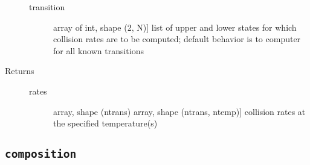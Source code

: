 \documentclass[letterpaper,10pt,english]{sphinxmanual}
\begin{document}
\begin{fulllineitems}
\begin{fulllineitems}
\begin{description}
\begin{description}
\item[{transition}] \leavevmode{[}array of int, shape (2, N){]}
list of upper and lower states for which collision rates
are to be computed; default behavior is to computer for
all known transitions

\end{description}

\item[{Returns}] \leavevmode\begin{description}
\item[{rates}] \leavevmode{[}array, shape (ntrans) \textbar{} array, shape (ntrans, ntemp){]}
collision rates at the specified temperature(s)

\end{description}

\end{description}

\end{fulllineitems}


\end{fulllineitems}



\subsection{\texttt{composition}}
\label{fulldoc:composition}
\end{document}

